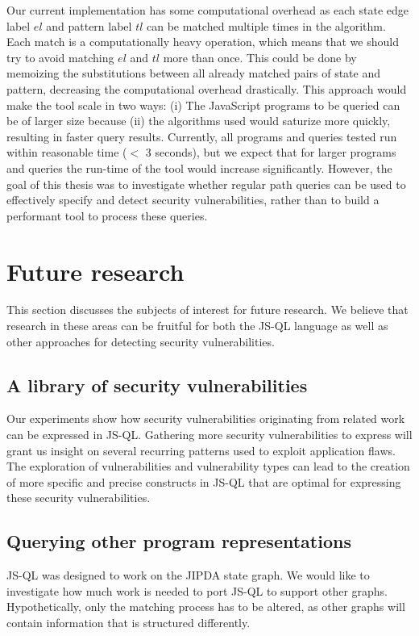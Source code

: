 Our current implementation has some computational overhead as each state edge label $el$ and pattern label $tl$ can be matched multiple times in the algorithm. Each match is a computationally heavy operation, which means that we should try to avoid matching $el$ and $tl$ more than once. This could be done by memoizing the substitutions between all already matched pairs of state and pattern, decreasing the computational overhead drastically. This approach would make the tool scale in two ways: (i) The JavaScript programs to be queried can be of larger size because (ii) the algorithms used would saturize more quickly, resulting in faster query results. Currently, all programs and queries tested run within reasonable time ($<$ 3 seconds), but we expect that for larger programs and queries the run-time of the tool would increase significantly. However, the goal of this thesis was to investigate whether regular path queries can be used to effectively specify and detect security vulnerabilities, rather than to build a performant tool to process these queries.

\section{Future research}

This section discusses the subjects of interest for future research. We believe that research in these areas can be fruitful for both the JS-QL language as well as other approaches for detecting security vulnerabilities.

\subsection*{A library of security vulnerabilities}
Our experiments show how security vulnerabilities originating from related work can be expressed in JS-QL. Gathering more security vulnerabilities to express will grant us insight on several recurring patterns used to exploit application flaws. The exploration of vulnerabilities and vulnerability types can lead to the creation of more specific and precise constructs in JS-QL that are optimal for expressing these security vulnerabilities.

\subsection*{Querying other program representations}
JS-QL was designed to work on the JIPDA state graph. We would like to investigate how much work is needed to port JS-QL to support other graphs. Hypothetically, only the matching process has to be altered, as other graphs will contain information that is structured differently. %

